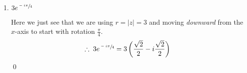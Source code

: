 \begin{enumerate}
\begin{enumerate}
		            \begin{align*}
			            e^{\sfrac{\pi i}{3}} & = \left( \frac{1}{2} + \frac{i\sqrt{3}}{2} \right)
		            \end{align*}
		            Break into workable factors:
		            \begin{align*}
			            e^{\sfrac{2\pi i}{3}}
			             & = e^{(\sfrac{\pi i}{3} \; + \; \sfrac{\pi i}{3} )} \\
			             & = e^{\sfrac{\pi i}{3}} e^{\sfrac{\pi i}{3}}        \\
		            \end{align*}
		            Then the algebra becomes:
		            \begin{align*}
			            e^{\sfrac{2\pi i}{3}} & = \left( \frac{1}{2} + \frac{i\sqrt{3}}{2} \right)
			            \left( \frac{1}{2} + \frac{i\sqrt{3}}{2} \right)                                     \\
			                                  & = \frac{1}{2} \frac{1}{2} + \frac{1}{2} \frac{i \sqrt{3}}{2}
			            + \frac{1}{2} \frac{i \sqrt{3}}{2} + \frac{i \sqrt{3}}{2} \frac{i \sqrt{3}}{2}       \\
			                                  & = \frac{1}{4} + \frac{i \sqrt{3}}{4}
			            + \frac{i \sqrt{3}}{4} - \frac{3}{4}                                                 \\
			                                  & = \frac{1}{4} + \frac{2i \sqrt{3}}{4}
			            - \frac{3}{4}                                                                        \\
			            \therefore \; e^{\sfrac{2\pi i}{3}}
			                                  & =  - \frac{1}{2} + \frac{i \sqrt{3}}{2}                      \\
		            \end{align*}
		            \qed

		      \item $3e^{\sfrac{-i\pi}{4}}$

		            Here we just see that we are using $r = |z| = 3$ and moving \textit{downward} from
		            the $x$-axis to start with rotation $\frac{\pi}{4}.$
		            \begin{align*}
			            \therefore \; 3e^{\sfrac{-i\pi}{4}}
			             & = 3 \left( \frac{\sqrt{2}}{2} - i\frac{\sqrt{2}}{2} \right) \\
		            \end{align*}
		            \qed



\end{enumerate}
\end{enumerate}
